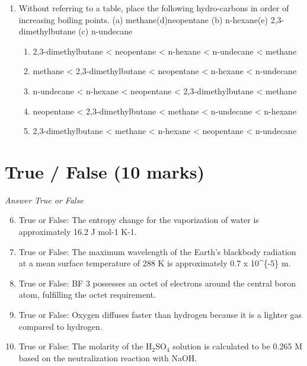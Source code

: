 \documentclass[12pt]{article}
\begin{document}
\begin{enumerate}[label=\arabic*.]
\begin{enumerate}[label=(\alph*)]
    \item 58,650.00 liters air
    \item 49,350.25 liters air
    \item 65,292.15 liters air
    \item 39,175.40 liters air
\end{enumerate}
\item Without referring to a table, place the following hydro-carbons in order of increasing boiling points. (a) methane(d)neopentane (b) n-hexane(e) 2,3-dimethylbutane (c) n-undecane
\begin{enumerate}[label=(\alph*)]
    \item 2,3-dimethylbutane \textless{} neopentane \textless{} n-hexane \textless{} n-undecane \textless{} methane
    \item methane \textless{} 2,3-dimethylbutane \textless{} neopentane \textless{} n-hexane \textless{} n-undecane
    \item n-undecane \textless{} n-hexane \textless{} neopentane \textless{} 2,3-dimethylbutane \textless{} methane
    \item neopentane \textless{} 2,3-dimethylbutane \textless{} methane \textless{} n-undecane \textless{} n-hexane
    \item 2,3-dimethylbutane \textless{} methane \textless{} n-hexane \textless{} neopentane \textless{} n-undecane
\end{enumerate}
\end{enumerate}

\section*{True / False (10 marks)}
\textit{Answer True or False}
\begin{enumerate}[label=\arabic*.]
\setcounter{enumi}{5}
\item True or False: The entropy change for the vaporization of water is approximately 16.2 J mol-1 K-1.
\item True or False: The maximum wavelength of the Earth's blackbody radiation at a mean surface temperature of 288 K is approximately 0.7 x 10^\{-5\} m.
\item True or False: BF 3 possesses an octet of electrons around the central boron atom, fulfilling the octet requirement.
\item True or False: Oxygen diffuses faster than hydrogen because it is a lighter gas compared to hydrogen.
\item True or False: The molarity of the H$_{2}$SO$_{4}$ solution is calculated to be 0.265 M based on the neutralization reaction with NaOH.
\end{enumerate}
\end{document}
